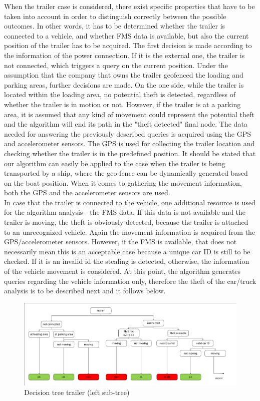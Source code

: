 When the trailer case is considered, there exist specific properties that have to be taken into account in order to distinguish correctly between the possible outcomes. In other words, it has to be determined whether the trailer is connected to a vehicle, and whether FMS data is available, but also the current position of the trailer has to be acquired. 
The first decision is made according to the information of the power connection. If it is the external one, the trailer is not connected, which triggers a query on the current position. Under the assumption that the company that owns the trailer geofenced the loading and parking areas, further decisions are made. On the one side, while the trailer is located within the loading area, no potential theft is detected, regardless of whether the trailer is in motion or not. However, if the trailer is at a parking area, it is assumed that any kind of movement could represent the potential theft and the algorithm will end its path in the "theft detected" final node. The data needed for answering the previously described queries is acquired using the GPS and accelerometer sensors. The GPS is used for collecting the trailer location and checking whether the trailer is in the predefined position. It should be stated that our algorithm can easily be applied to the case when the trailer is being transported by a ship, where the geo-fence can be dynamically generated based on the boat position. When it comes to gathering the movement information, both the GPS and the accelerometer sensors are used. \\
In case that the trailer is connected to the vehicle, one additional resource is used for the algorithm analysis - the FMS data. If this data is not available and the trailer is moving, the theft is obviously detected, because the trailer is attached to an unrecognized vehicle. Again the movement information is acquired from the GPS/accelerometer sensors. However, if the FMS is available, that does not necessarily mean this is an acceptable case because a unique car ID is still to be checked. If it is an invalid id the stealing is detected, otherwise, the information of the vehicle movement is considered. At this point, the algorithm generates queries regarding the vehicle information only, therefore the theft of the car/truck analysis is to be described next and it follows below.

\begin{figure} [h]
    \includegraphics[clip, trim=0.1cm 0.1cm 0.1cm 0.1cm, width=1\textwidth]{src/pic/DecisionTreeTrailer}
    \caption{Decision tree trailer (left sub-tree)}
    \label{fig::decisionTreeTrailer}
\end{figure}

